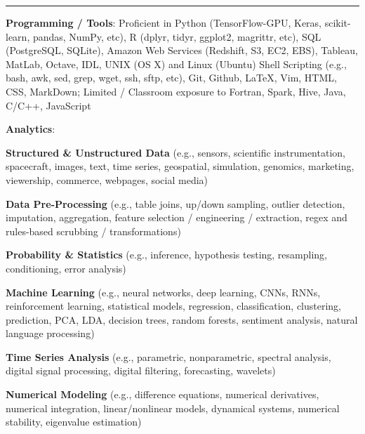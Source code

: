 \documentclass[10pt]{article}
\newcommand{\ressection}[1]{\noindent{\large\textbf{#1}}
\vspace{2pt}\hrule\vspace{4pt}}
\begin{document}


\vspace{0.5cm}
\ressection{Computing Skills}
\noindent\textbf{Programming / Tools}: Proficient in Python  
(TensorFlow-GPU, Keras, scikit-learn, pandas, NumPy, etc), R (dplyr, tidyr,
ggplot2, magrittr, etc), SQL (PostgreSQL, SQLite),
Amazon Web Services (Redshift, S3, EC2, EBS), Tableau, MatLab, Octave, IDL, 
UNIX (OS X) and Linux (Ubuntu) Shell Scripting (e.g., bash, awk, sed,
grep, wget, ssh, sftp, etc), Git, Github, 
LaTeX, Vim, HTML, CSS, MarkDown; Limited / Classroom
exposure to Fortran, Spark, Hive, Java, C/C++, JavaScript
  \vspace{0.1in}

\noindent\textbf{Analytics}:
\vspace{-0.2cm}
\begin{itemize*}
  \item \textbf{Structured \& Unstructured Data} (e.g., sensors,
    scientific instrumentation, spacecraft, 
    images, text, time series, geospatial, simulation, 
    genomics, marketing, viewership, commerce, webpages, social media)
  \item \textbf{Data Pre-Processing} (e.g., table joins, up/down sampling, outlier detection, 
    imputation, aggregation, feature selection / engineering /
    extraction, regex and rules-based scrubbing / transformations)
  \item \textbf{Probability \& Statistics} (e.g., inference,
    hypothesis testing, resampling, conditioning, error analysis)
  \item \textbf{Machine Learning} (e.g., neural networks,
    deep learning, CNNs, RNNs, reinforcement learning, statistical
    models, regression, classification, clustering, prediction,
    PCA, LDA, decision trees, random forests, sentiment analysis,
    natural language processing)
  \item \textbf{Time Series Analysis} (e.g., parametric, nonparametric, spectral
    analysis, digital signal processing, digital filtering, forecasting,
    wavelets)
  \item \textbf{Numerical Modeling}
    (e.g., difference equations, numerical derivatives, numerical
    integration, linear/nonlinear models, dynamical systems, numerical stability, 
    eigenvalue estimation)
\end{itemize*}
\end{document}
